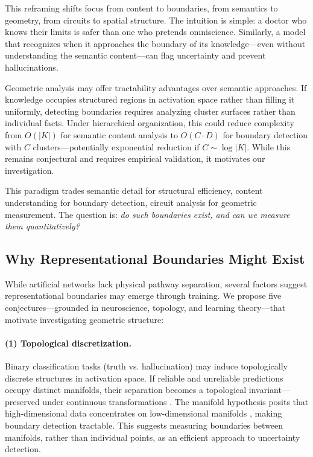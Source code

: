 \documentclass[11pt]{article}
\begin{document}
This reframing shifts focus from content to boundaries, from semantics to geometry, from circuits to spatial structure. The intuition is simple: a doctor who knows their limits is safer than one who pretends omniscience. Similarly, a model that recognizes when it approaches the boundary of its knowledge---even without understanding the semantic content---can flag uncertainty and prevent hallucinations.

Geometric analysis may offer tractability advantages over semantic approaches. If knowledge occupies structured regions in activation space rather than filling it uniformly, detecting boundaries requires analyzing cluster surfaces rather than individual facts. Under hierarchical organization, this could reduce complexity from $O(|K|)$ for semantic content analysis to $O(C \cdot D)$ for boundary detection with $C$ clusters---potentially exponential reduction if $C \sim \log |K|$. While this remains conjectural and requires empirical validation, it motivates our investigation.

This paradigm trades semantic detail for structural efficiency, content understanding for boundary detection, circuit analysis for geometric measurement. The question is: \textit{do such boundaries exist, and can we measure them quantitatively?}

\subsection{Why Representational Boundaries Might Exist}
\label{sec:intro-why}

While artificial networks lack physical pathway separation, several factors suggest representational boundaries may emerge through training. We propose five conjectures---grounded in neuroscience, topology, and learning theory---that motivate investigating geometric structure:

\paragraph{(1) Topological discretization.} Binary classification tasks (truth vs. hallucination) may induce topologically discrete structures in activation space. If reliable and unreliable predictions occupy distinct manifolds, their separation becomes a topological invariant---preserved under continuous transformations \citep{carlsson2009topology}. The manifold hypothesis posits that high-dimensional data concentrates on low-dimensional manifolds \citep{fefferman2016testing}, making boundary detection tractable. This suggests measuring boundaries between manifolds, rather than individual points, as an efficient approach to uncertainty detection.
\end{document}
